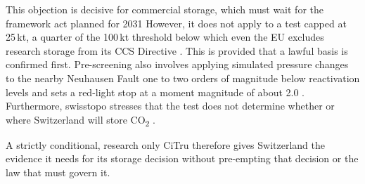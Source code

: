 \documentclass[11pt,a4paper]{article}
\newcommand{\COtwo}{CO\textsubscript{2}}
\begin{document}
This objection is decisive for commercial storage, which must wait for the framework act planned for 2031 \cite[pp.~6, 8]{FOEN2025Factsheet} However, it does not apply to a test capped at 25\,kt, a quarter of the 100\,kt threshold below which even the EU excludes research storage from its CCS Directive \cites[p.~13]{Affolter2024}{EU2009CCS}. This is provided that a lawful basis is confirmed first. Pre-screening also involves applying simulated pressure changes to the nearby
Neuhausen Fault one to two orders of magnitude below reactivation levels and
sets a red-light stop at a moment magnitude of about 2.0
\cite[pp.~1, 11]{Schultz2024}. Furthermore, swisstopo stresses that the test does not determine whether or where Switzerland will store \COtwo{} \cite{Brupbacher2024}.

A strictly conditional, research only CiTru therefore gives Switzerland the
evidence it needs for its storage decision without pre-empting that decision or
the law that must govern it.

\printbibliography[title={References}]
\end{document}
